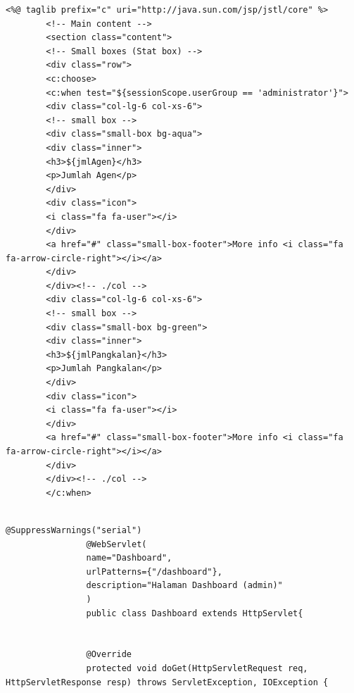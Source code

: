 \begin{enumerate}[a.]
			\begin{lstlisting}[caption=Potongan kode \textit{view} aplikasi berbasis web, label=viewWeb]
		 <%@ taglib prefix="c" uri="http://java.sun.com/jsp/jstl/core" %>
		<!-- Main content -->
		<section class="content">
		<!-- Small boxes (Stat box) -->
		<div class="row">
		<c:choose>
		<c:when test="${sessionScope.userGroup == 'administrator'}">
		<div class="col-lg-6 col-xs-6">
		<!-- small box -->
		<div class="small-box bg-aqua">
		<div class="inner">
		<h3>${jmlAgen}</h3>
		<p>Jumlah Agen</p>
		</div>
		<div class="icon">
		<i class="fa fa-user"></i>
		</div>
		<a href="#" class="small-box-footer">More info <i class="fa fa-arrow-circle-right"></i></a>
		</div>
		</div><!-- ./col -->
		<div class="col-lg-6 col-xs-6">
		<!-- small box -->
		<div class="small-box bg-green">
		<div class="inner">
		<h3>${jmlPangkalan}</h3>
		<p>Jumlah Pangkalan</p>
		</div>
		<div class="icon">
		<i class="fa fa-user"></i>
		</div>
		<a href="#" class="small-box-footer">More info <i class="fa fa-arrow-circle-right"></i></a>
		</div>
		</div><!-- ./col -->
		</c:when>   
		
		\end{lstlisting}
		
		
			\begin{lstlisting}[caption=Potongan kode \textit{controller} aplikasi berbasis web, label=controllerWeb]
				@SuppressWarnings("serial")
				@WebServlet(
				name="Dashboard",
				urlPatterns={"/dashboard"}, 
				description="Halaman Dashboard (admin)"
				)
				public class Dashboard extends HttpServlet{
				
				
				@Override
				protected void doGet(HttpServletRequest req, HttpServletResponse resp) throws ServletException, IOException {
				

\end{lstlisting}
\end{enumerate}
